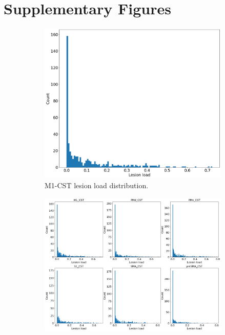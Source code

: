 \documentclass[10pt]{article}
\begin{document}
\section*{Supplementary Figures}
\begin{figure}
\begin{subfigure}{0.5\textwidth}
  \centering
  \includegraphics[width=1\linewidth]{figures/m1_lesionload.png}
  \caption{M1-CST lesion load distribution.}
  \label{fig:sfig1}
\end{subfigure}
\begin{subfigure}{0.5\textwidth}
  \centering
  \includegraphics[width=1\linewidth]{figures/all_lesionload.png}

\end{subfigure}
\end{figure}
\end{document}
